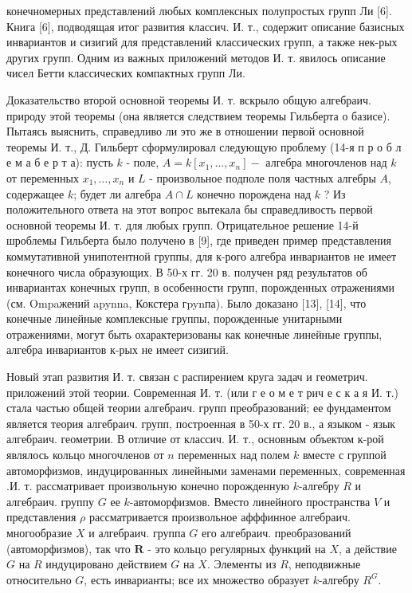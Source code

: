 \documentclass[10pt]{article}
\begin{document}
конечномерных представлений любых комплексных полупростых групп Ли [6]. Книга [6], подводящая итог развития классич. И. т., содержит описание базисных инвариантов и сизигий для представлений классических групп, а также нек-рых других групп. Одним из важных приложений методов И. т. явилось описание чисел Бетти классических компактных групп Ли.



Доказательство второй основной теоремы И. т. вскрыло общую алгебраич. природу этой теоремы (она является следствием теоремы Гильберта о базисе). Пытаясь выяснить, справедливо ли это же в отношении первой основной теоремы И. т., Д. Гильберт сформулировал следующую проблему (14-я п р о б л е м а б е р т а): пусть $k$ - поле, $A=k\left[x_{1}, \ldots, x_{n}\right]-$ алгебра многочленов над $k$ от переменных $x_{1}, \ldots, x_{n}$ и $L$ - произвольное подполе поля частных алгебры $A$, содержащее $k$; будет ли алгебра $A \cap L$ конечно порождена над $k$ ? Из положительного ответа на этот вопрос вытекала бы справедливость первой основной теоремы И. т. для любых групп. Отрицательное решение 14-й шроблемы Гильберта было получено в [9], где приведен пример представления коммутативной унипотентной группы, для к-рого алгебра инвариантов не имеет конечного числа образующих. В 50-х гг. 20 в. получен ряд результатов об инвариантах конечных групп, в особенности групп, порожденных отражениями (см. Ompaжений apynna, Кокстера гpynпа). Было доказано [13], [14], что конечные линейные комплексные группы, порожденные унитарными отражениями, могут быть охарактеризованы как конечные линейные группы, алгебра инвариантов к-рых не имеет сизигий.



Новый этап развития И. т. связан с распирением круга задач и геометрич. приложений этой теории. Современная И. т. (или г е о м е т рич е с к а я И. т.) стала частью общей теории алгебраич. групп преобразований; ее фундаментом является теория алгебраич. групп, построенная в 50-х гг. 20 в., а языком - язык алгебраич. геометрии. В отличие от классич. И. т., основным объектом к-рой являлось кольцо многочленов от $n$ переменных над полем $k$ вместе с группой автоморфизмов, индуцированных линейными заменами переменных, современная .И. т. рассматривает произвольную конечно порожденную $k$-алгебру $R$ и алгебраич. группу $G$ ее $k$-автоморфизмов. Вместо линейного пространства $V$ и представления $\rho$ рассматривается произвольное афффинное алгебраич. многообразие $X$ и алгебраич. группа $G$ его алгебраич. преобразований (автоморфизмов), так что $\boldsymbol{R}$ - это кольцо регулярных функций на $X$, а действие $G$ на $R$ индуцировано действием $G$ на $X$. Элементы из $R$, неподвижные относительно $G$, есть инварианты; все их множество образует $k$-алгебру $R^{G}$.
\end{document}
